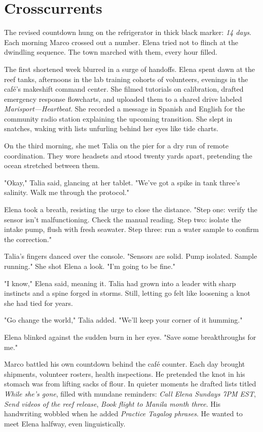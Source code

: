 \chapter{Crosscurrents}

The revised countdown hung on the refrigerator in thick black marker: \textit{14 days}. Each morning Marco crossed out a number. Elena tried not to flinch at the dwindling sequence. The town marched with them, every hour filled.

The first shortened week blurred in a surge of handoffs. Elena spent dawn at the reef tanks, afternoons in the lab training cohorts of volunteers, evenings in the café's makeshift command center. She filmed tutorials on calibration, drafted emergency response flowcharts, and uploaded them to a shared drive labeled \textit{Marisport—Heartbeat}. She recorded a message in Spanish and English for the community radio station explaining the upcoming transition. She slept in snatches, waking with lists unfurling behind her eyes like tide charts.

On the third morning, she met Talia on the pier for a dry run of remote coordination. They wore headsets and stood twenty yards apart, pretending the ocean stretched between them.

"Okay," Talia said, glancing at her tablet. "We've got a spike in tank three's salinity. Walk me through the protocol."

Elena took a breath, resisting the urge to close the distance. "Step one: verify the sensor isn't malfunctioning. Check the manual reading. Step two: isolate the intake pump, flush with fresh seawater. Step three: run a water sample to confirm the correction."

Talia's fingers danced over the console. "Sensors are solid. Pump isolated. Sample running." She shot Elena a look. "I'm going to be fine."

"I know," Elena said, meaning it. Talia had grown into a leader with sharp instincts and a spine forged in storms. Still, letting go felt like loosening a knot she had tied for years.

"Go change the world," Talia added. "We'll keep your corner of it humming."

Elena blinked against the sudden burn in her eyes. "Save some breakthroughs for me."

\bigskip

Marco battled his own countdown behind the café counter. Each day brought shipments, volunteer rosters, health inspections. He pretended the knot in his stomach was from lifting sacks of flour. In quieter moments he drafted lists titled \textit{While she's gone}, filled with mundane reminders: \textit{Call Elena Sundays 7PM EST}, \textit{Send videos of the reef release}, \textit{Book flight to Manila month three}. His handwriting wobbled when he added \textit{Practice Tagalog phrases}. He wanted to meet Elena halfway, even linguistically.

